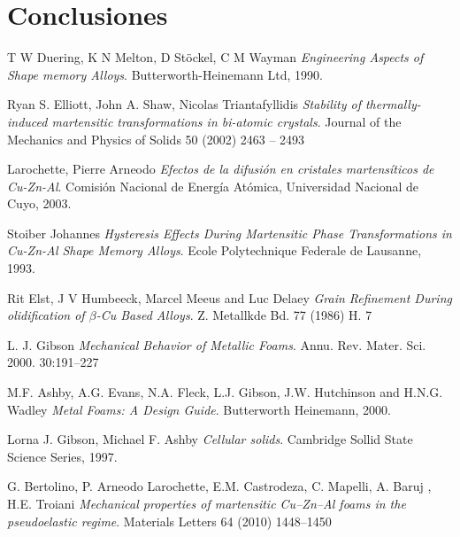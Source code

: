 \documentclass[a4paper,12pt,fleqn,twoside,openany]{book}
\begin{document}


\chapter{Conclusiones}


\begin{thebibliography}{3}

T W Duering, K N Melton, D St{\"o}ckel, C M Wayman 
\textit{Engineering Aspects of Shape memory Alloys}. 
Butterworth-Heinemann Ltd, 1990.
 
Ryan S. Elliott, John A. Shaw, Nicolas Triantafyllidis
\textit{Stability of thermally-induced martensitic
transformations in bi-atomic crystals}.
Journal of the Mechanics and Physics of Solids
50 (2002) 2463 – 2493

Larochette, Pierre Arneodo 
\textit{Efectos de la difusión en cristales martensíticos de Cu-Zn-Al}. 
Comisión Nacional de Energía Atómica, Universidad Nacional de Cuyo, 2003.

Stoiber Johannes 
\textit{Hysteresis Effects During Martensitic Phase Transformations in Cu-Zn-Al Shape Memory Alloys}. 
Ecole Polytechnique Federale de Lausanne, 1993.

Rit Elst, J V Humbeeck, Marcel Meeus and Luc Delaey
\textit{Grain Refinement During olidification of $\beta$-Cu Based Alloys}.
Z. Metallkde Bd. 77 (1986) H. 7

L. J. Gibson
\textit{Mechanical Behavior of Metallic Foams}.
Annu. Rev. Mater. Sci. 2000. 30:191–227

M.F. Ashby, A.G. Evans, N.A. Fleck, L.J. Gibson,
J.W. Hutchinson and H.N.G. Wadley
\textit{Metal Foams: A Design Guide}. 
Butterworth Heinemann, 2000.


Lorna J. Gibson, Michael F. Ashby  
\textit{Cellular solids}. 
Cambridge Sollid State Science Series, 1997.

G. Bertolino, P. Arneodo Larochette, E.M. Castrodeza, C. Mapelli, A. Baruj , H.E. Troiani
\textit{Mechanical properties of martensitic Cu–Zn–Al foams in the pseudoelastic regime}.
Materials Letters 64 (2010) 1448–1450


\end{thebibliography}
\end{document}

